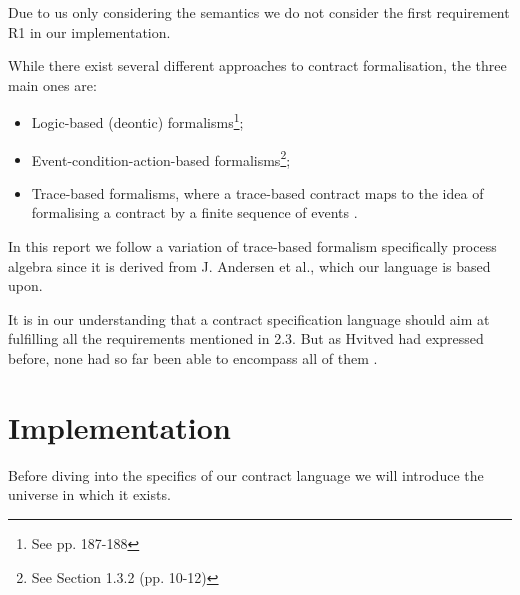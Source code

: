 \documentclass{ituthesis}
\begin{document}
\newpage
Due to us only considering the semantics we do not consider the first requirement R1 in our implementation.

While there exist several different approaches to contract formalisation, the three main ones are:
\begin{itemize}
    \item Logic-based (deontic) formalisms\footnote{See \cite{hvitved2011contract} pp. 187-188};
    \item Event-condition-action-based formalisms\footnote{See \cite{hvitved2011contract} Section 1.3.2 (pp. 10-12)};
    \item Trace-based formalisms, where a trace-based contract maps to the idea of formalising a contract by a finite sequence of events \cite{andersen2006compositional}.
\end{itemize}

In this report we follow a variation of trace-based formalism specifically process algebra since it is derived from J. Andersen et al., which our language is based upon.

It is in our understanding that a contract specification language should aim at fulfilling all the requirements mentioned in 2.3. But as Hvitved had expressed before, none had so far been able to encompass all of them \cite{hvitved2011contract}.


\chapter{Implementation}

Before diving into the specifics of our contract language we will introduce the universe in which it exists.
\end{document}
